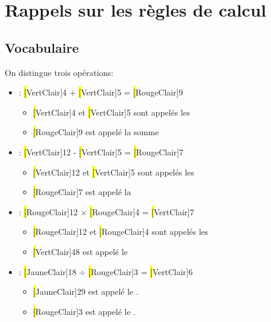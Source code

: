 \section{Rappels sur les règles de calcul}
\subsection{Vocabulaire}
\begin{definitionbox}
    On distingue trois opérations:
    \begin{itemize}[label=\textbullet]

        \item {} : \hl[VertClair]{4} + \hl[VertClair]{5} = \hl[RougeClair]{9}
            \begin{itemize}[label=\textbullet]
                \item \hl[VertClair]{4} et \hl[VertClair]{5} sont
                    appelés les 
                \item \hl[RougeClair]{9} est appelé la somme
            \end{itemize} 


        \item {}: \hl[VertClair]{12} - \hl[VertClair]{5}
            = \hl[RougeClair]{7}
            \begin{itemize}[label=\textbullet]
                \item \hl[VertClair]{12} et \hl[VertClair]{5} sont
                    appelés les 
                \item \hl[RougeClair]{7} est appelé la 
            \end{itemize} 

        \item {}: \hl[RougeClair]{12} $\times$ \hl[RougeClair]{4}
            = \hl[VertClair]{7}
            \begin{itemize}[label=\textbullet]
                \item \hl[RougeClair]{12} et \hl[RougeClair]{4} sont
                    appelés les 
                \item \hl[VertClair]{48} est appelé le
            \end{itemize} 

        \item {} : \hl[JauneClair]{18} $\div$
            \hl[RougeClair]{3} = \hl[VertClair]{6}
            \begin{itemize}[label=\textbullet]
                \item \hl[JauneClair]{29} est appelé le
                    .
                \item \hl[RougeClair]{3} est 
                    appelé le .


\end{itemize}
\end{itemize}
\end{definitionbox}
